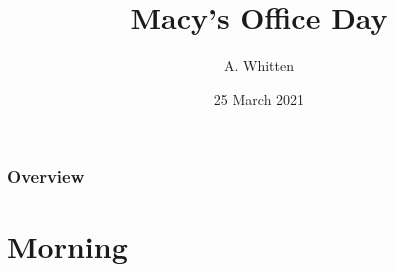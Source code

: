 \documentclass[12pt]{beamer}\usepackage[]{graphicx}\usepackage[]{color}
\title[Macy]{Macy's Office Day} %
\author{A. Whitten} %
\institute[IRBS] %
{
Illinois Natural History Survey \\ %
Illinois River Biological Station \\
Havana, IL 62644 USA \\ 
\medskip
\textit{awhitten@illinois.edu} %
}
\date{25 March 2021} %
\begin{document}
\begin{frame}
\titlepage %
\end{frame}


\begin{frame}
\frametitle{Overview} %
\tableofcontents %
\end{frame}

\section{Morning} %


\end{document}
